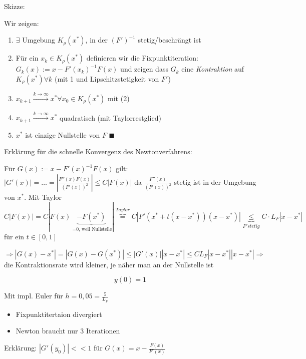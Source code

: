 \documentclass[10pt,a4paper]{article}
\begin{document}

\begin{bsp}

Skizze:

Wir zeigen:
\begin{enumerate}
\item $\exists$ Umgebung $K_\rho (x^{*})$, in der $(F')^{-1}$ stetig/beschrängt ist
\item Für ein $x_k \in K_\rho(x^{*})$ definieren wir die Fixpunktiteration: $G_k(x):=x - F'(x_k)^{-1}F(x)$ und zeigen dass $G_k$ eine \emph{Kontraktion} auf $K_\rho(x^{*}) \forall k$ (mit 1 und Lipschitzstetigkeit von $F'$)
\item $x_{k+1} \stackrel{k \rightarrow \infty}{\rightarrow} x^{*} \forall x_0 \in K_\rho(x^{*})$ mit (2)
\item $x_{k+1} \stackrel{k \rightarrow \infty}{\rightarrow} x^{*}$ quadratisch (mit Taylorrestglied)
\item $x^{*}$ ist einzige Nullstelle von $F$ $\blacksquare$
 
\end{enumerate}

Erklärung für die schnelle Konvergenz des Newtonverfahrens:

Für $G(x):=x-F'(x)^{-1}F(x)$ gilt: $|G'(x)|=\ldots=\left| \frac{F''(x)F(x)}{(F'(x))^{2}}  \right| \leq C |F(x)|$ da $\frac{F''(x)}{(F'(x))^{2}}$ stetig ist in der Umgebung von $x^{*}$. Mit Taylor $ C |F(x)| = C|F(x)\underbrace{-F(x^{*})}_{\text{ =0, weil Nullstelle}}| \overbrace{=}^{Taylor} C|F'(x^{*}+t(x-x^{*}))(x-x^{*})| \underbrace{\leq}_{F' stetig} C \cdot L_F |x-x^{*}|$ für ein $t \in [0,1]$

$\Rightarrow |G(x)-x^{*}|=|G(x)-G(x^{*})| \leq |G'(x)||x-x^{*}| \leq C L_F |x-x^{*}||x-x^{*}| \Rightarrow$ die Kontraktionsrate wird kleiner, je näher man an der Nullstelle ist
\end{bsp}

\begin{bsp}[$y'(t)=-99y(t)-\frac{y(t)}{1+y(t)^{2}}$]

$$y(0)=1$$

Mit impl. Euler für $h=0,05 = \frac{5}{L_F}$ \begin{itemize}
\item Fixpunktitertaion divergiert
\item Newton braucht nur 3 Iterationen
\end{itemize}

Erklärung: $|G'(y_0)|<<1$ für $G(x)=x-\frac{F(x)}{F'(x)}$

\end{bsp}
\end{document}
